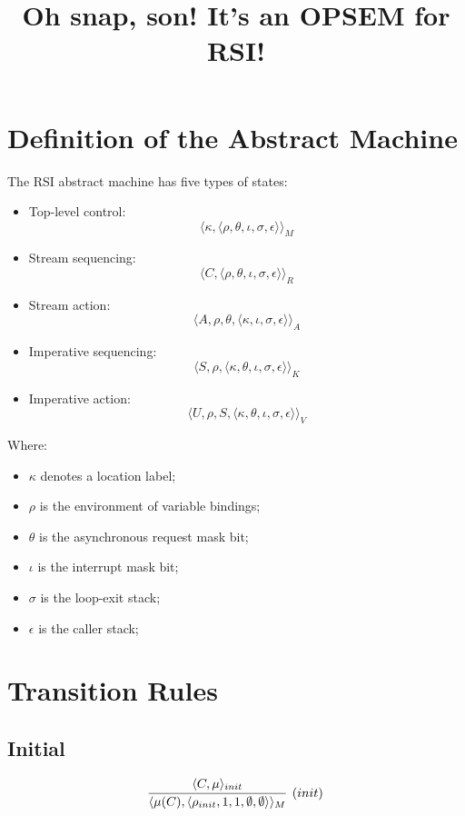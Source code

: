 \documentclass{article}
\title{Oh snap, son!  It's an OPSEM for RSI!}
\newcommand{\state}[1]{\langle #1 \rangle}
\begin{document}
\maketitle

\section{Definition of the Abstract Machine}

	The RSI abstract machine has five types of states:
	
\begin{itemize}

\item{Top-level control: \[ \state{\kappa, \state{\rho, \theta, \iota, \sigma, \epsilon}}_M \]}

\item{Stream sequencing: \[ \state{C, \state{\rho, \theta, \iota, \sigma, \epsilon}}_R\]}

\item{Stream action:} \[ \state{A, \rho, \theta, \state{\kappa, \iota, \sigma, \epsilon}}_A \]

\item{Imperative sequencing: \[  \state{S, \rho, \state{\kappa, \theta, \iota, \sigma, \epsilon}}_K \]}

\item{Imperative action: \[ \state{U, \rho, S, \state{\kappa, \theta, \iota, \sigma, \epsilon}}_V \]}


\end{itemize}

Where:

\begin{itemize}
\item{$\kappa$ denotes a location label;}
\item{$\rho$ is the environment of variable bindings;}
\item{$\theta$ is the asynchronous request mask bit;}
\item{$\iota$ is the interrupt mask bit;}
\item{$\sigma$ is the loop-exit stack;}
\item{$\epsilon$ is the caller stack;}
\end{itemize}

\section{Transition Rules}

\subsection{Initial}
\[
  \infer[(init)]{\state{\mu(C), \state{\rho_{init}, 1, 1, \emptyset, \emptyset}}_M}{\state{C, \mu}_{init}}
\]
\\
\end{document}
